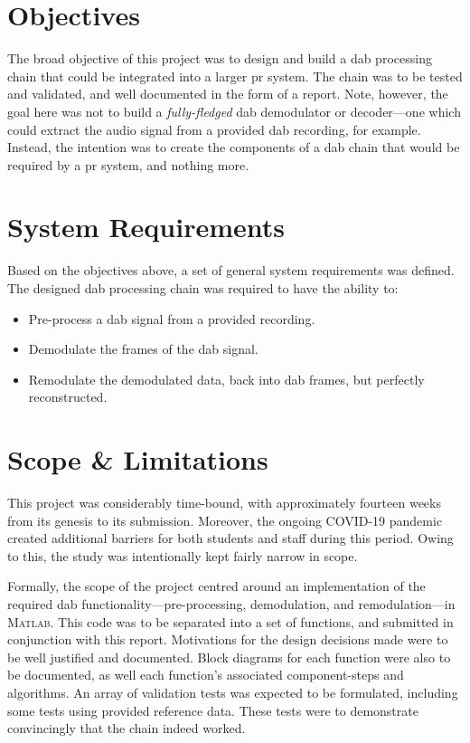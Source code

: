 \documentclass[class=report,11pt,crop=false]{standalone}
\begin{document}
\section{Objectives}
The broad objective of this project was to design and build a \gls{dab} processing chain that could be integrated into a larger \gls{pr} system. The chain was to be tested and validated, and well documented in the form of a report. Note, however, the goal here was not to build a \emph{fully-fledged} \gls{dab} demodulator or decoder---one which could extract the audio signal from a provided \gls{dab} recording, for example. Instead, the intention was to create the components of a \gls{dab} chain that would be required by a \gls{pr} system, and nothing more.

\section{System Requirements}
Based on the objectives above, a set of general system requirements was defined. The designed \gls{dab} processing chain was required to have the ability to:

{
    \begin{itemize}
        \item Pre-process a \gls{dab} signal from a provided recording.
        \item Demodulate the frames of the \gls{dab} signal.
        \item Remodulate the demodulated data, back into \gls{dab} frames, but perfectly reconstructed.
    \end{itemize}
}

\section{Scope \& Limitations}
This project was considerably time-bound, with approximately fourteen weeks from its genesis to its submission. Moreover, the ongoing COVID-19 pandemic created additional barriers for both students and staff during this period. Owing to this, the study was intentionally kept fairly narrow in scope.

Formally, the scope of the project centred around an implementation of the required \gls{dab} functionality---pre-processing, demodulation, and remodulation---in \textsc{Matlab}. This code was to be separated into a set of functions, and submitted in conjunction with this report. Motivations for the design decisions made were to be well justified and documented. Block diagrams for each function were also to be documented, as well each function's associated component-steps and algorithms. An array of validation tests was expected to be formulated, including some tests using provided reference data. These tests were to demonstrate convincingly that the chain indeed worked.
\end{document}
